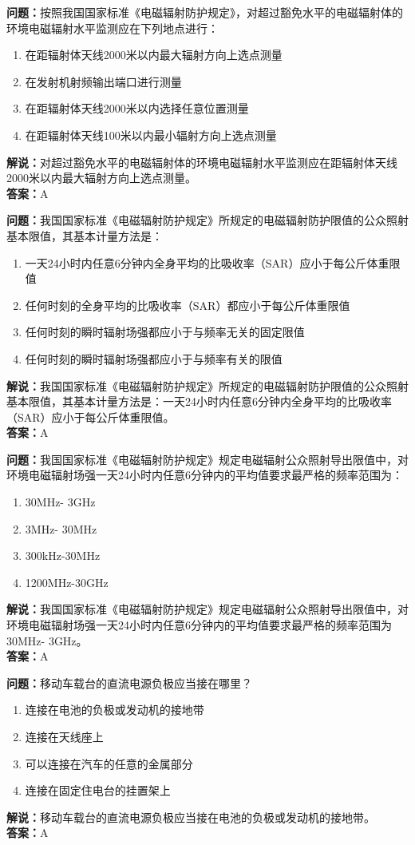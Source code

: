 \documentclass[UTF8]{ctexbook}
\begin{document}
\textbf{问题：}按照我国国家标准《电磁辐射防护规定》，对超过豁免水平的电磁辐射体的环境电磁辐射水平监测应在下列地点进行：
\begin{enumerate}[label=\Alph*), leftmargin=3em]
  \item 在距辐射体天线2000米以内最大辐射方向上选点测量
  \item 在发射机射频输出端口进行测量
  \item 在距辐射体天线2000米以内选择任意位置测量
  \item 在距辐射体天线100米以内最小辐射方向上选点测量
\end{enumerate}
\textbf{解说：}对超过豁免水平的电磁辐射体的环境电磁辐射水平监测应在距辐射体天线2000米以内最大辐射方向上选点测量。\\
\textbf{答案：}A

\textbf{问题：}我国国家标准《电磁辐射防护规定》所规定的电磁辐射防护限值的公众照射基本限值，其基本计量方法是：
\begin{enumerate}[label=\Alph*), leftmargin=3em]
  \item 一天24小时内任意6分钟内全身平均的比吸收率（SAR）应小于每公斤体重限值
  \item 任何时刻的全身平均的比吸收率（SAR）都应小于每公斤体重限值
  \item 任何时刻的瞬时辐射场强都应小于与频率无关的固定限值
  \item 任何时刻的瞬时辐射场强都应小于与频率有关的限值
\end{enumerate}
\textbf{解说：}我国国家标准《电磁辐射防护规定》所规定的电磁辐射防护限值的公众照射基本限值，其基本计量方法是：一天24小时内任意6分钟内全身平均的比吸收率（SAR）应小于每公斤体重限值。\\
\textbf{答案：}A

\textbf{问题：}我国国家标准《电磁辐射防护规定》规定电磁辐射公众照射导出限值中，对环境电磁辐射场强一天24小时内任意6分钟内的平均值要求最严格的频率范围为：
\begin{enumerate}[label=\Alph*), leftmargin=3em]
  \item 30MHz- 3GHz
  \item 3MHz- 30MHz
  \item 300kHz-30MHz
  \item 1200MHz-30GHz
\end{enumerate}
\textbf{解说：}我国国家标准《电磁辐射防护规定》规定电磁辐射公众照射导出限值中，对环境电磁辐射场强一天24小时内任意6分钟内的平均值要求最严格的频率范围为30MHz- 3GHz。\\
\textbf{答案：}A

\textbf{问题：}移动车载台的直流电源负极应当接在哪里？
\begin{enumerate}[label=\Alph*), leftmargin=3em]
  \item 连接在电池的负极或发动机的接地带
  \item 连接在天线座上
  \item 可以连接在汽车的任意的金属部分
  \item 连接在固定住电台的挂置架上
\end{enumerate}
\textbf{解说：}移动车载台的直流电源负极应当接在电池的负极或发动机的接地带。\\
\textbf{答案：}A
\end{document}
